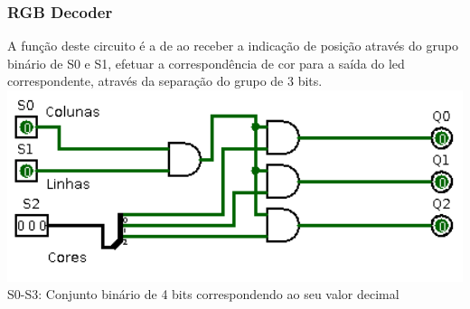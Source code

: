 \documentclass[12pt,a4paper,portrait]{article}
\begin{document}
			\subsubsection{RGB Decoder} \label{ssec:num1}
				A função deste circuito é a de ao receber a indicação de posição através do grupo binário de S0 e S1, efetuar a correspondência de cor para a saída do led correspondente, através da separação do grupo de 3 bits.\\
				\includegraphics[width=1.0\textwidth]{imagens/rgbdec}
				S0-S3: Conjunto binário de 4 bits correspondendo ao seu valor decimal\\
		\newpage						
\end{document}
